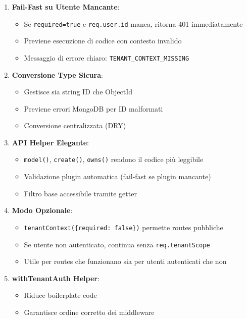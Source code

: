 \documentclass[11pt,a4paper]{article}
\begin{document}
\begin{enumerate}
    \item \textbf{Fail-Fast su Utente Mancante}:
    \begin{itemize}
        \item Se \texttt{required=true} e \texttt{req.user.id} manca, ritorna 401 immediatamente
        \item Previene esecuzione di codice con contesto invalido
        \item Messaggio di errore chiaro: \texttt{TENANT\_CONTEXT\_MISSING}
    \end{itemize}
    
    \item \textbf{Conversione Type Sicura}:
    \begin{itemize}
        \item Gestisce sia string ID che ObjectId
        \item Previene errori MongoDB per ID malformati
        \item Conversione centralizzata (DRY)
    \end{itemize}
    
    \item \textbf{API Helper Elegante}:
    \begin{itemize}
        \item \texttt{model()}, \texttt{create()}, \texttt{owns()} rendono il codice più leggibile
        \item Validazione plugin automatica (fail-fast se plugin mancante)
        \item Filtro base accessibile tramite getter
    \end{itemize}
    
    \item \textbf{Modo Opzionale}:
    \begin{itemize}
        \item \texttt{tenantContext(\{required: false\})} permette routes pubbliche
        \item Se utente non autenticato, continua senza \texttt{req.tenantScope}
        \item Utile per routes che funzionano sia per utenti autenticati che non
    \end{itemize}
    
    \item \textbf{withTenantAuth Helper}:
    \begin{itemize}
        \item Riduce boilerplate code
        \item Garantisce ordine corretto dei middleware
    \end{itemize}
\end{enumerate}
\end{document}
